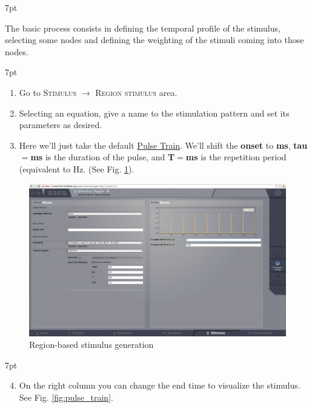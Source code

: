 \documentclass{tufte-handout}
\newenvironment{formal}{%
  \def\FrameCommand{%
    \hspace{1pt}%
    {\color{DarkBlue}\vrule width 2pt}%
    {\color{formalshade}\vrule width 4pt}%
    \colorbox{formalshade}%
  }%
  \MakeFramed{\advance\hsize-\width\FrameRestore}%
  \noindent\hspace{-4.55pt}%
  \begin{adjustwidth}{}{7pt}%
  \vspace{2pt}\vspace{2pt}%
}
{%
  \vspace{2pt}\end{adjustwidth}\endMakeFramed%
}
\newenvironment{blah}{%
  \def\FrameCommand{%
    \hspace{1pt}%
    {\color{DarkOrange}\vrule width 2pt}%
    {\color{PeachPuff}\vrule width 4pt}%
    \colorbox{PeachPuff}%
  }%
  \MakeFramed{\advance\hsize-\width\FrameRestore}%
  \noindent\hspace{-4.55pt}%
  \begin{adjustwidth}{}{7pt}%
  \vspace{2pt}\vspace{2pt}%
}
{%
  \vspace{2pt}\end{adjustwidth}\endMakeFramed%
}
\begin{document}
\begin{blah}
The basic process consists in defining the temporal profile of the stimulus,  selecting some nodes and defining the weighting of the stimuli coming
into those nodes.
\end{blah}

\begin{formal}
\begin{enumerate}
\item Go to \textsc{Stimulus} $\rightarrow$ \textsc{Region stimulus} area. 
\item Selecting an equation, give a name to the stimulation pattern and set its parameters as desired.
\item Here we'll just take the default \underline{Pulse Train}. We'll shift the \textbf{onset} to \textbf{ \unit[500]{ms}}, \textbf{tau}$\mathbf{=}$\textbf{\unit[5]{ms}} is the duration of the pulse, and \textbf{T}$\mathbf{=}$\textbf{\unit[500]{ms}} is the repetition period (equivalent to \unit[2]{Hz}.  (See Fig. \ref{fig:stimulus_region}).
\end{enumerate}
\end{formal}

\begin{figure}[h]
  \includegraphics[width=\linewidth]{Handout_UI_HeterogenousModelAndStimulation_StimulusRegion}%
  \caption{Region-based stimulus generation}%
  \label{fig:stimulus_region}%
\end{figure}




\begin{formal}
\begin{enumerate}[resume]
\setcounter{enumi}{3}
\item On the right column you can change the end time to visualize the stimulus. See Fig. \ref{fig:pulse_train}.
\end{enumerate}
\end{formal}
\end{document}
